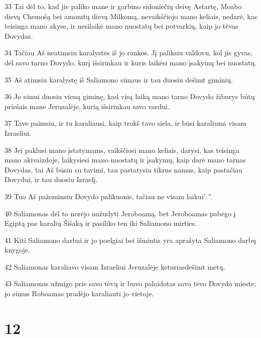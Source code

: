 \par 33 Tai dėl to, kad jie paliko mane ir garbino sidoniečių deivę Astartę, Moabo dievą Chemošą bei amonitų dievą Milkomą, nevaikščiojo mano keliais, nedarė, kas teisinga mano akyse, ir nesilaikė mano nuostatų bei potvarkių, kaip jo tėvas Dovydas. 
\par 34 Tačiau Aš neatimsiu karalystės iš jo rankos. Jį paliksiu valdovu, kol jis gyvas, dėl savo tarno Dovydo, kurį išsirinkau ir kuris laikėsi mano įsakymų bei nuostatų. 
\par 35 Aš atimsiu karalystę iš Saliamono sūnaus ir tau duosiu dešimt giminių. 
\par 36 Jo sūnui duosiu vieną giminę, kad visą laiką mano tarno Dovydo žiburys būtų priešais mane Jeruzalėje, kurią išsirinkau savo vardui. 
\par 37 Tave paimsiu, ir tu karaliausi, kaip trokš tavo siela, ir būsi karaliumi visam Izraeliui. 
\par 38 Jei paklusi mano įstatymams, vaikščiosi mano keliais, darysi, kas teisinga mano akivaizdoje, laikysiesi mano nuostatų ir įsakymų, kaip darė mano tarnas Dovydas, tai Aš būsiu su tavimi, tau pastatysiu tikrus namus, kaip pastačiau Dovydui, ir tau duosiu Izraelį. 
\par 39 Tuo Aš pažeminsiu Dovydo palikuonis, tačiau ne visam laikui’ ”. 
\par 40 Saliamonas dėl to norėjo nužudyti Jeroboamą, bet Jeroboamas pabėgo į Egiptą pas karalių Šišaką ir pasiliko ten iki Saliamono mirties. 
\par 41 Kiti Saliamono darbai ir jo poelgiai bei išmintis yra aprašyta Saliamono darbų knygoje. 
\par 42 Saliamonas karaliavo visam Izraeliui Jeruzalėje keturiasdešimt metų. 
\par 43 Saliamonas užmigo prie savo tėvų ir buvo palaidotas savo tėvo Dovydo mieste; jo sūnus Roboamas pradėjo karaliauti jo vietoje.



\chapter{12}

